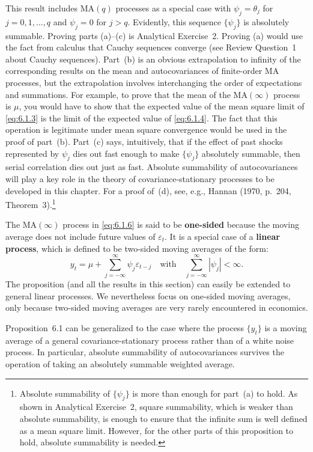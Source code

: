 This result includes $\text{MA}(q)$ processes as a special case with $\psi_j = \theta_j$ for
$j = 0, 1, \ldots, q$ and $\psi_j = 0$ for $j > q$. Evidently, this sequence $\{\psi_j\}$ is absolutely
summable. Proving parts (a)--(c) is Analytical Exercise~2. Proving (a) would use
the fact from calculus that Cauchy sequences converge (see Review Question~1
about Cauchy sequences). Part~(b) is an obvious extrapolation to infinity of the
corresponding results on the mean and autocovariances of finite-order MA processes,
but the extrapolation involves interchanging the order of expectations and
summations. For example, to prove that the mean of the $\text{MA}(\infty)$ process is $\mu$, you
would have to show that the expected value of the mean square limit of \eqref{eq:6.1.3} is
the limit of the expected value of \eqref{eq:6.1.4}. The fact that this operation is legitimate
under mean square convergence would be used in the proof of part~(b). Part~(c)
says, intuitively, that if the effect of past shocks represented by $\psi_j$ dies out fast
enough to make $\{\psi_j\}$ absolutely summable, then serial correlation dies out just as
fast. Absolute summability of autocovariances will play a key role in the theory of
covariance-stationary processes to be developed in this chapter. For a proof of~(d),
see, e.g., Hannan (1970, p.~204, Theorem~3).\footnote{Absolute summability of $\{\psi_j\}$ is more than enough for part~(a) to hold. As shown in Analytical Exercise~2, square summability, which is weaker than absolute summability, is enough to ensure that the infinite sum is well defined as a mean square limit. However, for the other parts of this proposition to hold, absolute summability is needed.}

The $\text{MA}(\infty)$ process in \eqref{eq:6.1.6} is said to be \textbf{one-sided} because the moving
average does not include future values of $\varepsilon_t$. It is a special case of a \textbf{linear process},
which is defined to be two-sided moving averages of the form:
\[
  y_t = \mu + \sum_{j=-\infty}^{\infty} \psi_j \varepsilon_{t-j}
  \quad \text{with} \quad \sum_{j=-\infty}^{\infty} |\psi_j| < \infty.
\]
The proposition (and all the results in this section) can easily be extended to general
linear processes. We nevertheless focus on one-sided moving averages, only
because two-sided moving averages are very rarely encountered in economics.

Proposition~6.1 can be generalized to the case where the process $\{y_t\}$ is a moving
average of a general covariance-stationary process rather than of a white noise
process. In particular, absolute summability of autocovariances survives the operation
of taking an absolutely summable weighted average.

